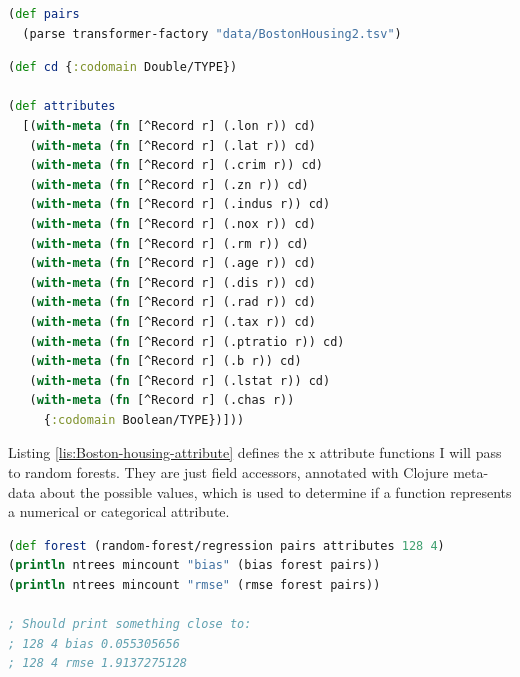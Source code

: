 \documentclass[10pt,openany]{article}
\numberwithin{definition}{section}
\numberwithin{example}{section}
\numberwithin{equation}{section}
\numberwithin{figure}{section}
\begin{document}
\begin{minipage}[t]{1\columnwidth}%
\begin{lstlisting}[caption={Reading the Boston housing data},label={lis:Reading-the-Boston-1},language=clojure,tabsize=2]
(def pairs 
  (parse transformer-factory "data/BostonHousing2.tsv")
\end{lstlisting}
%
\end{minipage}

\begin{minipage}[t]{1\columnwidth}%
\begin{lstlisting}[caption={Boston housing attribute functions},label={lis:Boston-housing-attribute},language=clojure,tabsize=2]
(def cd {:codomain Double/TYPE})

(def attributes
  [(with-meta (fn [^Record r] (.lon r)) cd)
   (with-meta (fn [^Record r] (.lat r)) cd)
   (with-meta (fn [^Record r] (.crim r)) cd)
   (with-meta (fn [^Record r] (.zn r)) cd)
   (with-meta (fn [^Record r] (.indus r)) cd)
   (with-meta (fn [^Record r] (.nox r)) cd)
   (with-meta (fn [^Record r] (.rm r)) cd)
   (with-meta (fn [^Record r] (.age r)) cd)
   (with-meta (fn [^Record r] (.dis r)) cd)
   (with-meta (fn [^Record r] (.rad r)) cd)
   (with-meta (fn [^Record r] (.tax r)) cd)
   (with-meta (fn [^Record r] (.ptratio r)) cd)
   (with-meta (fn [^Record r] (.b r)) cd)
   (with-meta (fn [^Record r] (.lstat r)) cd)
   (with-meta (fn [^Record r] (.chas r)) 
     {:codomain Boolean/TYPE})])) 

\end{lstlisting}
%
\end{minipage}

Listing \ref{lis:Boston-housing-attribute} defines the x attribute
functions I will pass to random forests. They are just field accessors,
annotated with Clojure meta-data about the possible values, which
is used to determine if a function represents a numerical or categorical
attribute. 

\begin{minipage}[t]{1\columnwidth}%
\begin{lstlisting}[caption={Boston housing forest on training data},label={lis:Boston-housing-forest},language=clojure,tabsize=2]
(def forest (random-forest/regression pairs attributes 128 4)
(println ntrees mincount "bias" (bias forest pairs))        
(println ntrees mincount "rmse" (rmse forest pairs))

; Should print something close to:
; 128 4 bias 0.055305656 
; 128 4 rmse 1.9137275128 

\end{lstlisting}
%
\end{minipage}
\end{document}
